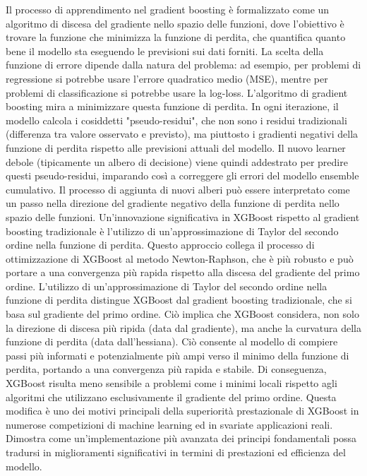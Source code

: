 \documentclass[a4paper,12pt]{report}
\begin{document}
	Il processo di apprendimento nel gradient boosting è formalizzato come un algoritmo di discesa del gradiente nello spazio delle funzioni, dove l'obiettivo è trovare la funzione che minimizza la funzione di perdita, che quantifica quanto bene il modello sta eseguendo le previsioni sui dati forniti. La scelta della funzione di errore dipende dalla natura del problema: ad esempio, per problemi di regressione si potrebbe usare l'errore quadratico medio (MSE), mentre per problemi di classificazione si potrebbe usare la log-loss. L'algoritmo di gradient boosting mira a minimizzare questa funzione di perdita. In ogni iterazione, il modello calcola i cosiddetti "pseudo-residui", che non sono i residui tradizionali (differenza tra valore osservato e previsto), ma piuttosto i gradienti negativi della funzione di perdita rispetto alle previsioni attuali del modello. Il nuovo learner debole (tipicamente un albero di decisione) viene quindi addestrato per predire questi pseudo-residui, imparando così a correggere gli errori del modello ensemble cumulativo. Il processo di aggiunta di nuovi alberi può essere interpretato come un passo nella direzione del gradiente negativo della funzione di perdita nello spazio delle funzioni. Un'innovazione significativa in XGBoost rispetto al gradient boosting tradizionale è l'utilizzo di un'approssimazione di Taylor del secondo ordine nella funzione di perdita. Questo approccio collega il processo di ottimizzazione di XGBoost al metodo Newton-Raphson, che è più robusto e può portare a una convergenza più rapida rispetto alla discesa del gradiente del primo ordine. L'utilizzo di un'approssimazione di Taylor del secondo ordine nella funzione di perdita distingue XGBoost dal gradient boosting tradizionale, che si basa sul gradiente del primo ordine. Ciò implica che XGBoost considera, non solo la direzione di discesa più ripida (data dal gradiente), ma anche la curvatura della funzione di perdita (data dall'hessiana). Ciò consente al modello di compiere passi più informati e potenzialmente più ampi verso il minimo della funzione di perdita, portando a una convergenza più rapida e stabile. Di conseguenza, XGBoost risulta meno sensibile a problemi come i minimi locali rispetto agli algoritmi che utilizzano esclusivamente il gradiente del primo ordine. Questa modifica è uno dei motivi principali della superiorità prestazionale di XGBoost in numerose competizioni di machine learning ed in svariate applicazioni reali. Dimostra come un'implementazione più avanzata dei principi fondamentali possa tradursi in miglioramenti significativi in termini di prestazioni ed efficienza del modello.
	
\end{document}
